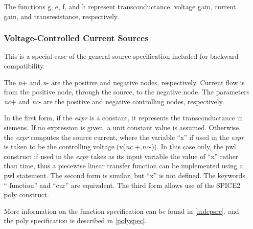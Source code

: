 The functions {\vt g}, {\vt e}, {\vt f}, and {\vt h} represent
transconductance, voltage gain, current gain, and transresistance,
respectively.

\subsubsection{Voltage-Controlled Current Sources}


This is a special case of the general source specification included
for backward compatibility.


The {\it n\/}{\vt +} and {\it n\/}{\vt -} are the positive and
negative nodes, respectively.  Current flow is from the positive node,
through the source, to the negative node.  The parameters {\it
nc\/}{\vt +} and {\it nc\/}{\vt -} are the positive and negative
controlling nodes, respectively.

In the first form, if the {\it expr} is a constant, it represents the
transconductance in siemens.  If no expression is given, a unit
constant value is assumed.  Otherwise, the {\it expr} computes the
source current, where the variable ``{\vt x}'' if used in the {\it
expr} is taken to be the controlling voltage (v({\it nc\/}{\vt
+},{\it nc\/}{\vt -})).  In this case only, the {\vt pwl} construct
if used in the {\it expr} takes as its input variable the value of
``{\vt x}'' rather than time, thus a piecewise linear transfer
function can be implemented using a {\vt pwl} statement.  The second
form is similar, but ``{\vt x}'' is not defined.  The keywords ``{\vt
function}'' and ``{\vt cur}'' are equivalent.  The third form allows
use of the SPICE2 {\vt poly} construct.

More information on the function specification can be found in
\ref{indepsrc}, and the {\vt poly} specification is described in
\ref{polyspec}.

